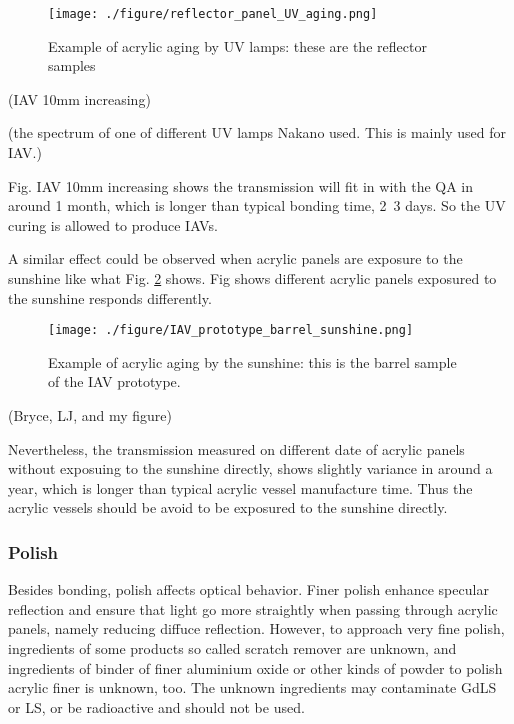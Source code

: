 \begin{figure}[h]
    \centering
    \texttt{[image: ./figure/reflector\_panel\_UV\_aging.png]}
    \caption{Example of acrylic aging by UV lamps: these are the reflector samples}
    \label{ReflectorAging}
    \end{figure}



(IAV 10mm increasing)


(the spectrum of one of different UV lamps Nakano used. This is mainly used for IAV.)


Fig. IAV 10mm increasing shows the transmission will fit in with the QA in around 1 month, which is longer than typical
bonding time, 2~3 days. So the UV curing is allowed to produce IAVs.

A similar effect could be observed when acrylic panels are exposure to the sunshine like what
Fig. \ref{IAVPrototypeBarrelSunshineAging} shows. Fig shows different
acrylic panels exposured to the sunshine responds differently.


\begin{figure}[h]
    \centering
    \texttt{[image: ./figure/IAV\_prototype\_barrel\_sunshine.png]}
    \caption{Example of acrylic aging by the sunshine: this is the barrel sample of the IAV prototype.}
    \label{IAVPrototypeBarrelSunshineAging}
    \end{figure}

(Bryce, LJ, and my figure)


Nevertheless, the transmission measured on different date of acrylic panels without exposuing to the sunshine directly,
shows slightly variance in around a year, which is longer than typical acrylic vessel manufacture time.
Thus the acrylic vessels should be avoid to be exposured to the sunshine directly.


\subsubsection {Polish}

Besides bonding, polish affects optical behavior.
Finer polish enhance specular reflection and ensure that light
go more straightly when passing through acrylic panels, namely
reducing diffuce reflection. However, to approach very fine polish,
ingredients of some products so called scratch remover are unknown, and
ingredients of binder of finer aluminium oxide or other kinds of powder to polish
acrylic finer is unknown, too. The unknown ingredients may contaminate GdLS or LS, or
be radioactive and should not be used.

